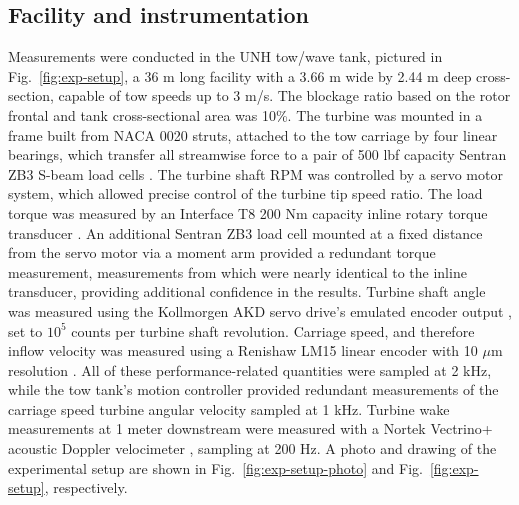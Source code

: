 \documentclass[10pt,letterpaper]{article}
\begin{document}
\subsection*{Facility and instrumentation}

Measurements were conducted in the UNH tow/wave tank, pictured in
Fig.~\ref{fig:exp-setup}, a 36 m long facility with a 3.66 m wide by 2.44 m deep
cross-section, capable of tow speeds up to 3 m/s. The blockage ratio based on
the rotor frontal and tank cross-sectional area was 10\%. The turbine was
mounted in a frame built from NACA 0020 struts, attached to the tow carriage by
four linear bearings, which transfer all streamwise force to a pair of 500 lbf
capacity Sentran ZB3 S-beam load cells \cite{SentranZB}. The turbine shaft RPM
was controlled by a servo motor system, which allowed precise control of the
turbine tip speed ratio. The load torque was measured by an Interface T8 200 Nm
capacity inline rotary torque transducer \cite{InterfaceT8}. An additional
Sentran ZB3 load cell mounted at a fixed distance from the servo motor via a
moment arm provided a redundant torque measurement, measurements from which were
nearly identical to the inline transducer, providing additional confidence in
the results. Turbine shaft angle was measured using the Kollmorgen AKD servo
drive's emulated encoder output \cite{KollmorgenAKD}, set to $10^5$ counts per
turbine shaft revolution. Carriage speed, and therefore inflow velocity was
measured using a Renishaw LM15 linear encoder with 10 $\mu$m resolution
\cite{RenishawLM15}. All of these performance-related quantities were sampled at
2 kHz, while the tow tank's motion controller provided redundant measurements of
the carriage speed turbine angular velocity sampled at 1 kHz. Turbine wake
measurements at 1 meter downstream were measured with a Nortek Vectrino+
acoustic Doppler velocimeter \cite{NortekVectrino}, sampling at 200 Hz. A photo
and drawing of the experimental setup are shown in
Fig.~\ref{fig:exp-setup-photo} and Fig.~\ref{fig:exp-setup}, respectively.
\end{document}
